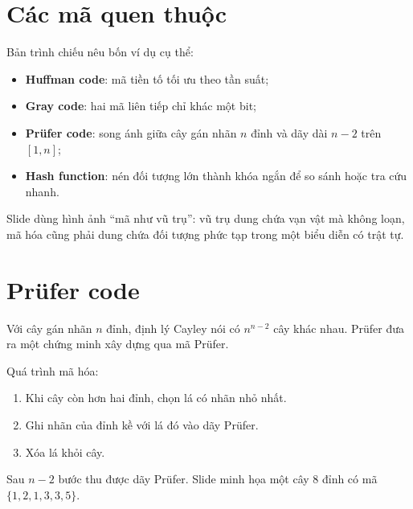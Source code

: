 \documentclass[11pt]{article}
\begin{document}
\section{Các mã quen thuộc}

Bản trình chiếu nêu bốn ví dụ cụ thể:
\begin{itemize}
  \item \textbf{Huffman code}: mã tiền tố tối ưu theo tần suất;
  \item \textbf{Gray code}: hai mã liên tiếp chỉ khác một bit;
  \item \textbf{Prüfer code}: song ánh giữa cây gán nhãn \(n\) đỉnh và dãy dài
  \(n-2\) trên \([1,n]\);
  \item \textbf{Hash function}: nén đối tượng lớn thành khóa ngắn để so sánh
  hoặc tra cứu nhanh.
\end{itemize}
Slide dùng hình ảnh ``mã như vũ trụ'': vũ trụ dung chứa vạn vật mà không loạn,
mã hóa cũng phải dung chứa đối tượng phức tạp trong một biểu diễn có trật tự.

\section{Prüfer code}

Với cây gán nhãn \(n\) đỉnh, định lý Cayley nói có \(n^{n-2}\) cây khác nhau.
Prüfer đưa ra một chứng minh xây dựng qua mã Prüfer.

Quá trình mã hóa:
\begin{enumerate}
  \item Khi cây còn hơn hai đỉnh, chọn lá có nhãn nhỏ nhất.
  \item Ghi nhãn của đỉnh kề với lá đó vào dãy Prüfer.
  \item Xóa lá khỏi cây.
\end{enumerate}
Sau \(n-2\) bước thu được dãy Prüfer. Slide minh họa một cây \(8\) đỉnh có mã
\(\{1,2,1,3,3,5\}\).

\begin{center}
\end{center}
\end{document}
